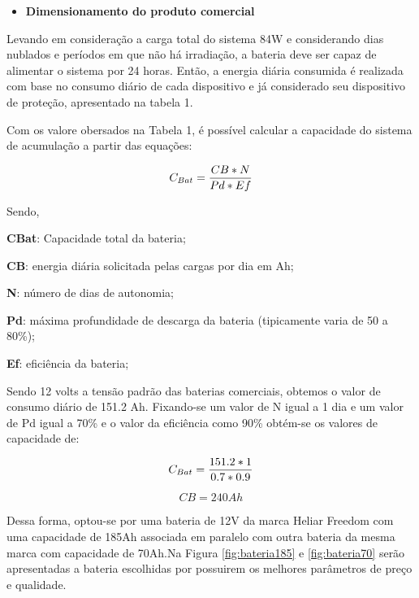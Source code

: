 \begin{itemize}
 \item\textbf{Dimensionamento do produto comercial}
\end{itemize}
Levando em consideração a carga total do sistema 84W e considerando dias nublados e períodos em que não há irradiação, a bateria deve ser capaz de alimentar o sistema por 24 horas.
Então, a energia diária consumida é realizada com base no consumo diário de cada dispositivo e já considerado seu dispositivo de proteção, apresentado na tabela 1.

Com os valore obersados na Tabela 1, é possível calcular a capacidade do sistema de acumulação a partir das equações:

\begin{equation}
    C_{Bat} = \frac{CB*N}{Pd*Ef}\\
\end{equation}




Sendo,

\textbf{CBat}: Capacidade total da bateria;

\textbf{CB}: energia diária solicitada pelas cargas por dia em Ah;

\textbf{N}: número de dias de autonomia;

\textbf{Pd}: máxima profundidade de descarga da bateria (tipicamente varia de 50 a 80\%);

\textbf{Ef}: eficiência da bateria;

Sendo 12 volts a tensão padrão das baterias comerciais, obtemos o valor de consumo diário de 151.2 Ah. Fixando-se um valor de N igual a 1 dia e um valor de Pd igual a 70\% e o valor da eficiência como 90\% obtém-se os valores de capacidade de:

\begin{equation}
    C_{Bat} = \frac{151.2*1}{0.7*0.9}\\
\end{equation}

\begin{equation}
    CB = 240 Ah
\end{equation}



Dessa forma, optou-se por uma bateria de 12V da marca Heliar Freedom com uma capacidade de 185Ah associada em paralelo com outra bateria da mesma marca com capacidade de 70Ah.Na Figura \ref{fig:bateria185} e \ref{fig:bateria70} serão apresentadas a bateria escolhidas por possuirem os melhores parâmetros de preço e qualidade.

